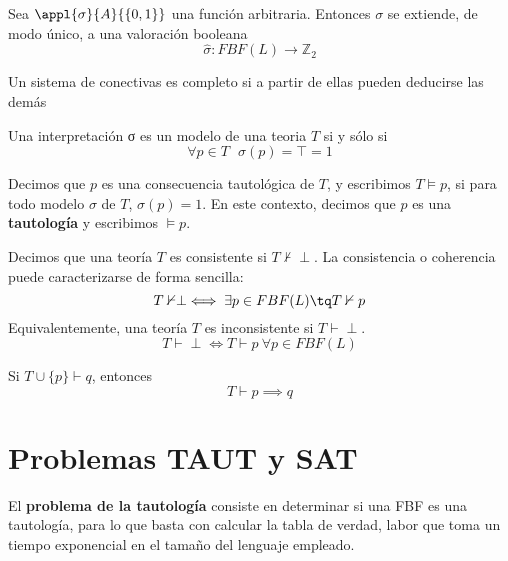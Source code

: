 \documentclass{apuntes}
\begin{document}
\begin{theorem}
	Sea $\appl{\sigma}{A}{\{0, 1\}}$ una función arbitraria. Entonces $\sigma$ se extiende, de modo único, a una valoración booleana $$\hat{\sigma}:FBF(L) \to \mathbb{Z}_2$$
\end{theorem}

\begin{defn}
Un sistema de conectivas es completo si a partir de ellas pueden deducirse las demás
\end{defn}

\begin{defn}[Modelo]
Una interpretación σ es un modelo de una teoria $T$ si y sólo si
\[\forall p \in T \ \ \ σ(p)=\top=1\]
\end{defn}

\begin{defn}
	Decimos que $p$ es una consecuencia tautológica de $T$, y escribimos $T\vDash p$, si para todo modelo $\sigma$ de $T$, $\sigma(p) = 1$. En este contexto, decimos que $p$ es una \textbf{tautología} y escribimos  $\vDash p$.
\end{defn}

\begin{defn}
Decimos que una teoría $T$ es consistente si $T\nvdash \perp$. La consistencia o coherencia puede caracterizarse de forma sencilla:
 $$T\nvdash\perp \iff \exists p\in FBF(L) \tq  T\nvdash p$$
 Equivalentemente, una teoría $T$ es inconsistente si $T\vdash \perp$.
 $$T\vdash\perp \iff T\vdash p\ \forall p\in FBF(L)$$
\end{defn}

\begin{theorem}
	Si $T\cup\{p\}\vdash q$, entonces $$T\vdash p\implies q$$
\end{theorem}

\section{Problemas TAUT y SAT}
\begin{defn}
El \textbf{problema de la tautología} consiste en determinar si una FBF es una tautología, para lo que basta con calcular la tabla de verdad, labor que toma un tiempo exponencial en el tamaño del lenguaje empleado.
\end{defn}
\end{document}
